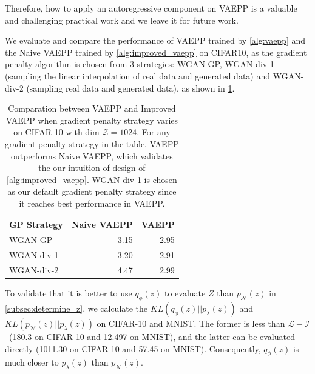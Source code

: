 Therefore, how to apply an autoregressive component on VAEPP is a valuable and challenging practical work and we leave it for future work.

We evaluate and compare the performance of VAEPP trained by \cref{alg:vaepp} and the Naive VAEPP trained by \cref{alg:improved_vaepp} on CIFAR10, as the gradient penalty algorithm is chosen from 3 strategies: WGAN-GP, WGAN-div-1 (sampling the linear interpolation of  real data and generated data) and WGAN-div-2 (sampling real data and generated data), as shown in \cref{tab:compare_nD_over_R}. 
\begin{table}[tb]
\centering
\begin{tabular}{lrr}  
\toprule
GP Strategy  &  Naive VAEPP  & VAEPP \\
\midrule
WGAN-GP      &  3.15   & 2.95      \\
WGAN-div-1   &  3.20   & 2.91      \\
WGAN-div-2   &  4.47   & 2.99      \\
\bottomrule
\end{tabular}
\caption{Comparation between VAEPP and Improved VAEPP when gradient penalty strategy varies on CIFAR-10 with dim $\mathcal{Z} = 1024$. For any gradient penalty strategy in the table, VAEPP outperforms Naive VAEPP, which validates the our intuition of design of \cref{alg:improved_vaepp}.  WGAN-div-1 is chosen as our default gradient penalty strategy since it reaches best performance in VAEPP. 
}
\label{tab:compare_nD_over_R}
\end{table}

To validate that it is better to use $q_\phi(z)$ to evaluate $Z$ than $p_\mathcal{N}(z)$ in \cref{subsec:determine_z}, we calculate the $KL(q_\phi(z)||p_\lambda(z))$ and $KL(p_\mathcal{N}(z)||p_\lambda(z))$ on CIFAR-10 and MNIST. The former is less than $\mathcal{L}-\mathcal{I}$~\cite{hoffman2016elbo}(180.3 on CIFAR-10 and 12.497 on MNIST), and the latter can be evaluated directly (1011.30 on CIFAR-10 and 57.45 on MNIST). Consequently, $q_\phi(z)$ is much closer to $p_\lambda(z)$ than $p_\mathcal{N}(z)$. 

